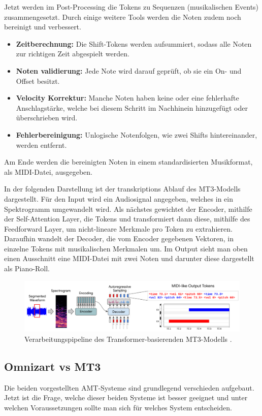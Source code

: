 Jetzt werden im Post-Processing die Tokens zu Sequenzen (musikalischen Events) zusammengesetzt.
Durch einige weitere Tools werden die Noten zudem noch bereinigt und verbessert.
\begin{itemize}
  \item \textbf{Zeitberechnung:} Die Shift-Tokens werden aufsummiert, sodass alle Noten zur richtigen Zeit abgespielt werden.
  \item \textbf{Noten validierung:} Jede Note wird darauf geprüft, ob sie ein On- und Offset besitzt.
  \item \textbf{Velocity Korrektur:} Manche Noten haben keine oder eine fehlerhafte Anschlagstärke, welche bei diesem Schritt im Nachhinein hinzugefügt oder überschrieben wird.
  \item \textbf{Fehlerbereinigung:} Unlogische Notenfolgen, wie zwei Shifts hintereinander, werden entfernt.
\end{itemize}
Am Ende werden die bereinigten Noten in einem standardisierten Musikformat, als MIDI-Datei, ausgegeben.

In der folgenden Darstellung ist der transkriptions Ablauf des MT3-Modells dargestellt.
Für den Input wird ein Audiosignal angegeben, welches in ein Spektrogramm umgewandelt wird.
Als nächstes gewichtet der Encoder, mithilfe der Self-Attention Layer, die Tokens und transformiert dann diese,
mithilfe des Feedforward Layer, um nicht-lineare Merkmale pro Token zu extrahieren.
Daraufhin wandelt der Decoder, die vom Encoder gegebenen Vektoren, in einzelne Tokens mit musikalischen Merkmalen um.
Im Output sieht man oben einen Ausschnitt eine MIDI-Datei mit zwei Noten und darunter diese dargestellt als Piano-Roll.
\begin{figure}[H]
    \centering
    \includegraphics[width=1\textwidth]{Graphics/transcription_transformer}
    \caption[Verarbeitungspipeline des MT3-Modells]{Verarbeitungspipeline des Transformer-basierenden MT3-Modells \cite{mt3colab}.}
    \label{fig:mt3_process}
\end{figure}

\subsection{Omnizart vs MT3}
Die beiden vorgestellten AMT-Systeme sind grundlegend verschieden aufgebaut.
Jetzt ist die Frage, welche dieser beiden Systeme ist besser geeignet
und unter welchen Voraussetzungen sollte man sich für welches System entscheiden.

